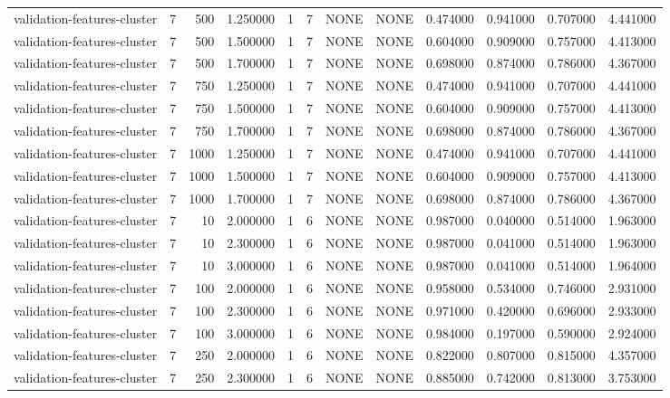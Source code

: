 \begin{tabular}{lrrrllllrrrr}
validation-features-cluster & 7 & 500 & 1.250000 & 1 & 7 & NONE & NONE & 0.474000 & 0.941000 & 0.707000 & 4.441000 \\
validation-features-cluster & 7 & 500 & 1.500000 & 1 & 7 & NONE & NONE & 0.604000 & 0.909000 & 0.757000 & 4.413000 \\
validation-features-cluster & 7 & 500 & 1.700000 & 1 & 7 & NONE & NONE & 0.698000 & 0.874000 & 0.786000 & 4.367000 \\
validation-features-cluster & 7 & 750 & 1.250000 & 1 & 7 & NONE & NONE & 0.474000 & 0.941000 & 0.707000 & 4.441000 \\
validation-features-cluster & 7 & 750 & 1.500000 & 1 & 7 & NONE & NONE & 0.604000 & 0.909000 & 0.757000 & 4.413000 \\
validation-features-cluster & 7 & 750 & 1.700000 & 1 & 7 & NONE & NONE & 0.698000 & 0.874000 & 0.786000 & 4.367000 \\
validation-features-cluster & 7 & 1000 & 1.250000 & 1 & 7 & NONE & NONE & 0.474000 & 0.941000 & 0.707000 & 4.441000 \\
validation-features-cluster & 7 & 1000 & 1.500000 & 1 & 7 & NONE & NONE & 0.604000 & 0.909000 & 0.757000 & 4.413000 \\
validation-features-cluster & 7 & 1000 & 1.700000 & 1 & 7 & NONE & NONE & 0.698000 & 0.874000 & 0.786000 & 4.367000 \\
validation-features-cluster & 7 & 10 & 2.000000 & 1 & 6 & NONE & NONE & 0.987000 & 0.040000 & 0.514000 & 1.963000 \\
validation-features-cluster & 7 & 10 & 2.300000 & 1 & 6 & NONE & NONE & 0.987000 & 0.041000 & 0.514000 & 1.963000 \\
validation-features-cluster & 7 & 10 & 3.000000 & 1 & 6 & NONE & NONE & 0.987000 & 0.041000 & 0.514000 & 1.964000 \\
validation-features-cluster & 7 & 100 & 2.000000 & 1 & 6 & NONE & NONE & 0.958000 & 0.534000 & 0.746000 & 2.931000 \\
validation-features-cluster & 7 & 100 & 2.300000 & 1 & 6 & NONE & NONE & 0.971000 & 0.420000 & 0.696000 & 2.933000 \\
validation-features-cluster & 7 & 100 & 3.000000 & 1 & 6 & NONE & NONE & 0.984000 & 0.197000 & 0.590000 & 2.924000 \\
validation-features-cluster & 7 & 250 & 2.000000 & 1 & 6 & NONE & NONE & 0.822000 & 0.807000 & 0.815000 & 4.357000 \\
validation-features-cluster & 7 & 250 & 2.300000 & 1 & 6 & NONE & NONE & 0.885000 & 0.742000 & 0.813000 & 3.753000 \\

\end{tabular}
